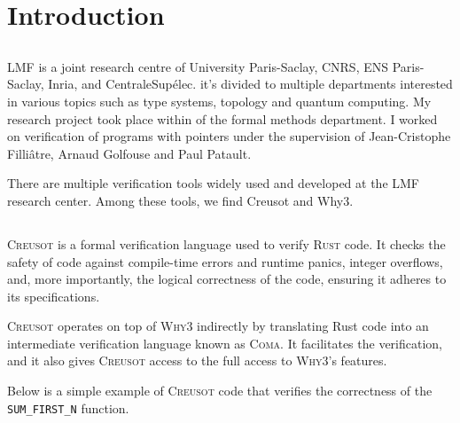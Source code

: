 \documentclass[11pt,a4paper]{article}
\begin{document}


\tableofcontents

\newpage
{} 

\section{Introduction}

\subsection{}
\ident LMF is a joint research centre of University Paris-Saclay, CNRS, ENS Paris-Saclay, Inria, and CentraleSupélec. it's divided to multiple departments interested in various topics such as type systems, topology and quantum computing. My research project took place within  of the formal methods department. I worked on verification of programs with pointers under the supervision of Jean-Cristophe Filliâtre, Arnaud Golfouse and Paul Patault.

There are multiple verification tools widely used and developed at the LMF research center. Among these tools, we find Creusot and Why3.

\subsection{}
\subsubsection{}
\textsc{Creusot} is a formal verification language used to verify \textsc{Rust} code. It checks the safety of code against compile-time errors and runtime panics, integer overflows, and, more importantly, the logical correctness of the code, ensuring it adheres to its specifications.

\textsc{Creusot} operates on top of \textsc{Why3} indirectly by translating Rust code into an intermediate verification language known as \textsc{Coma}. It facilitates the verification, and it also gives \textsc{Creusot} access to the full access to \textsc{Why3}'s features.

Below is a simple example of \textsc{Creusot} code that verifies the correctness of the \texttt{SUM\_FIRST\_N} function.
\end{document}
